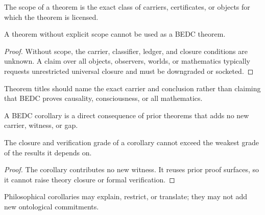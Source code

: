 \begin{definition}
\label{def:philosophy-theorem-scope}
The scope of a theorem is the exact class of carriers, certificates, or
objects for which the theorem is licensed.
\end{definition}

\begin{theorem}
\label{thm:philosophy-unscoped-theorems-refused}
A theorem without explicit scope cannot be used as a BEDC theorem.
\end{theorem}
\begin{proof}
Without scope, the carrier, classifier, ledger, and closure conditions
are unknown. A claim over all objects, observers, worlds, or
mathematics typically requests unrestricted universal closure and must
be downgraded or socketed.
\end{proof}

\begin{corollary}
\label{cor:philosophy-theorem-titles-not-overstate}
Theorem titles should name the exact carrier and conclusion rather than
claiming that BEDC proves causality, consciousness, or all mathematics.
\end{corollary}

\begin{definition}
\label{def:philosophy-bedc-corollary-discipline}
A BEDC corollary is a direct consequence of prior theorems that adds no
new carrier, witness, or gap.
\end{definition}

\begin{theorem}
\label{thm:philosophy-corollaries-do-not-increase-strength}
The closure and verification grade of a corollary cannot exceed the
weakest grade of the results it depends on.
\end{theorem}
\begin{proof}
The corollary contributes no new witness. It reuses prior proof
surfaces, so it cannot raise theory closure or formal verification.
\end{proof}

\begin{corollary}
\label{cor:philosophy-philosophical-corollaries-conservative}
Philosophical corollaries may explain, restrict, or translate; they may
not add new ontological commitments.
\end{corollary}

